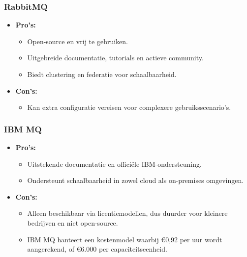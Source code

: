 \subsubsection{RabbitMQ}
\begin{itemize}
    \item \textbf{Pro's:}
    \begin{itemize}
        \item Open-source en vrij te gebruiken.
        \item Uitgebreide documentatie, tutorials en actieve community.
        \item Biedt clustering en federatie voor schaalbaarheid.
    \end{itemize}
    \item \textbf{Con's:}
    \begin{itemize}
        \item Kan extra configuratie vereisen voor complexere gebruiksscenario's.
    \end{itemize}
\end{itemize}

\subsubsection{IBM MQ}
\begin{itemize}
    \item \textbf{Pro's:}
    \begin{itemize}
        \item Uitstekende documentatie en officiële IBM-ondersteuning.
        \item Ondersteunt schaalbaarheid in zowel cloud als on-premises omgevingen.
    \end{itemize}
    \item \textbf{Con's:}
    \begin{itemize}
        \item Alleen beschikbaar via licentiemodellen, dus duurder voor kleinere bedrijven en niet open-source.
        \item IBM MQ hanteert een kostenmodel waarbij €0,92 per uur wordt aangerekend, of €6.000 per capaciteitseenheid. 
    \end{itemize}
\end{itemize}

